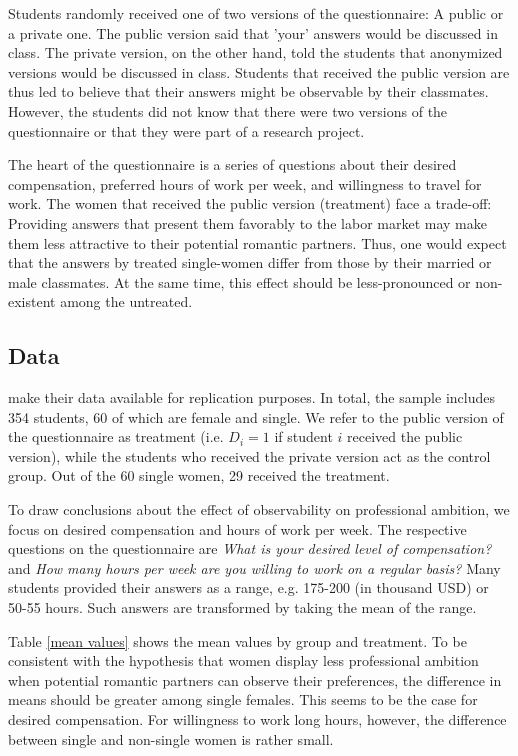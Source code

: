 \documentclass[aodsor,preprint]{imsart}
\numberwithin{equation}{section}
\theoremstyle{plain}
\begin{document}
Students randomly received one of two versions of the questionnaire: A public or a private one. The public version said that 'your' answers would be discussed in class. The private version, on the other hand, told the students that anonymized versions would be discussed in class. Students that received the public version are thus led to believe that their answers might be observable by their classmates. However, the students did not know that there were two versions of the questionnaire or that they were part of a research project.

The heart of the questionnaire is a series of questions about their desired compensation, preferred hours of work per week, and willingness to travel for work. The women that received the public version (treatment) face a trade-off: Providing answers that present them favorably to the labor market may make them less attractive to their potential romantic partners. Thus, one would expect that the answers by treated single-women differ from those by their married or male classmates. At the same time, this effect should be less-pronounced or non-existent among the untreated.


\subsection{Data}

\cite{Bursztyn_2017} make their data available for replication purposes. In total, the sample includes 354 students, 60 of which are female and single. We refer to the public version of the questionnaire as treatment (i.e. $D_i = 1$ if student $i$ received the public version), while the students who received the private version act as the control group. Out of the 60 single women, 29 received the treatment.

To draw conclusions about the effect of observability on professional ambition, we focus on desired compensation and hours of work per week. The respective questions on the questionnaire are \textit{What is your desired level of compensation?} and \textit{How many hours per week are you willing to work on a regular basis?} Many students provided their answers as a range, e.g. 175-200 (in thousand USD) or 50-55 hours. Such answers are transformed by taking the mean of the range.

Table \ref{mean values} shows the mean values by group and treatment. To be consistent with the hypothesis that women display less professional ambition when potential romantic partners can observe their preferences, the difference in means should be greater among single females. This seems to be the case for desired compensation. For willingness to work long hours, however, the difference between single and non-single women is rather small. 
\end{document}
